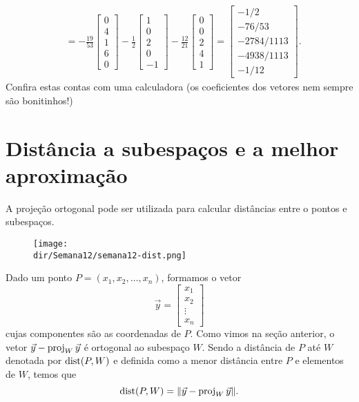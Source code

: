 \documentclass[../livro.tex]{subfiles}  %
\providecommand{\dir}{..}
\begin{document}
\begin{example}
\[\begin{split}
                & = -\frac{19}{53} \begin{bmatrix}
 0\\4\\1 \\ 6 \\0
\end{bmatrix} - \frac{1}{2} \begin{bmatrix}
 1\\0\\2\\0\\-1
\end{bmatrix} - \frac{12}{21} \begin{bmatrix}
 0\\0\\2\\4\\ 1
\end{bmatrix} =
\begin{bmatrix}
 -1/2 \\ -76/53 \\ -2784/1113 \\ -4938/1113 \\ -1/12
\end{bmatrix}.
\end{split}
\]Confira estas contas com uma calculadora (os coeficientes dos vetores nem sempre são bonitinhos!)
\end{example}



\section{Distância a subespaços e a melhor aproximação}


A projeção ortogonal pode ser utilizada para calcular distâncias entre o pontos e subespaços.

\begin{figure}[h!]
\begin{center}
\texttt{[image: \\dir/Semana12/semana12-dist.png]}
\end{center}
\end{figure}

\noindent Dado um ponto $P = (x_1, x_2, \dots, x_n)$, formamos o vetor
\[
\vec{y} =
\begin{bmatrix}
x_1 \\ x_2 \\ \vdots \\ x_n
\end{bmatrix}
\] cujas componentes são as coordenadas de $P$. Como vimos na seção anterior, o vetor $\vec{y} - \operatorname{proj}_{W} \vec{y}$ é ortogonal ao subespaço $W$. Sendo a distância de $P$ até $W$ denotada por $\operatorname{dist} (P,W)$ e definida como a menor distância entre $P$ e elementos de $W$, temos que
\[
\operatorname{dist} (P,W) = \|\vec{y} - \operatorname{proj}_{W} \vec{y}\|.
\]
\end{document}
